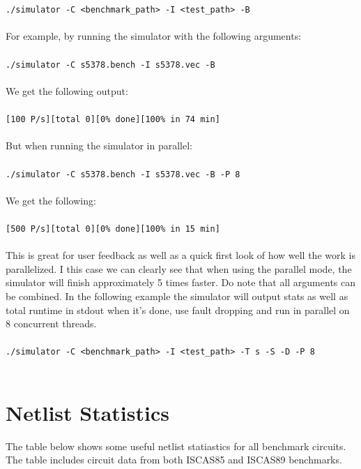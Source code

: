 \documentclass[a4paper,12pt]{article}
\begin{document}
\\\\ \texttt{./simulator -C <benchmark\_path> -I <test\_path> -B} \\\\
For example, by running the simulator with the following arguments:
\\\\ \texttt{./simulator -C s5378.bench -I s5378.vec -B} \\\\
We get the following output:
\\\\ \texttt{[100 P/s][total 0][0\% done][100\% in 74 min]} \\\\
But when running the simulator in parallel:
\\\\ \texttt{./simulator -C s5378.bench -I s5378.vec -B -P 8} \\\\
We get the following:
\\\\\texttt{[500 P/s][total 0][0\% done][100\% in 15 min]}\\\\
This is great for user feedback as well as a quick first look of how well the work is parallelized. I this case we can clearly see that when using the parallel mode, the simulator will finish approximately 5 times faster. Do note that all arguments can be combined. In the following example the simulator will output stats as well as total runtime in stdout when it's done, use fault dropping and run in parallel on 8 concurrent threads.
\\\\ \texttt{./simulator -C <benchmark\_path> -I <test\_path> -T s -S -D -P 8} \\\\

\clearpage 

\section*{Netlist Statistics}

The table below shows some useful netlist statiastics for all benchmark circuits. The table includes circuit data from both ISCAS85 and ISCAS89 benchmarks.
\end{document}
